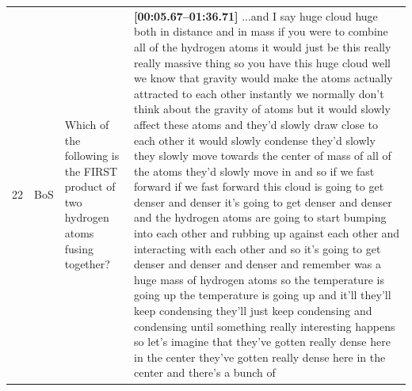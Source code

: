 \documentclass[10pt]{article}
\begin{document}
\begin{tiny}
\begin{longtable}{|r|p{0.375in}|p{1.275in}|p{3.5in}|}
22 &          BoS &                                                                                                                                                                                               Which of the following is the FIRST product of two hydrogen atoms fusing together? &                                                                                                                                                                                                                                                                                                                                                                                                                                                                                                                                                                                                                                                                                                                                                                                                                                                                                                                                                                                                                                                                                                                                                                                                                                                                                                                                                                                                                                                                                                                                                                                                                                                                                                                                                                                                \textbf{[00:05.67--01:36.71]} ...and I say huge cloud huge both in distance and in mass if you were to combine all of the hydrogen atoms it would just be this really really massive thing so you have this huge cloud well we know that gravity would make the atoms actually attracted to each other instantly we normally don't think about the gravity of atoms but it would slowly affect these atoms and they'd slowly draw close to each other it would slowly condense they'd slowly they slowly move towards the center of mass of all of the atoms they'd slowly move in and so if we fast forward if we fast forward this cloud is going to get denser and denser it's going to get denser and denser and the hydrogen atoms are going to start bumping into each other and rubbing up against each other and interacting with each other and so it's going to get denser and denser and denser and remember was a huge mass of hydrogen atoms so the temperature is going up the temperature is going up and it'll they'll keep condensing they'll just keep condensing and condensing until something really interesting happens so let's imagine that they've gotten really dense here in the center they've gotten really dense here in the center and there's a bunch of 
\end{longtable}
\end{tiny}
\end{document}

